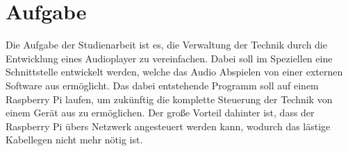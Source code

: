 \section{Aufgabe}
Die Aufgabe der Studienarbeit ist es, die Verwaltung der Technik durch die
Entwicklung eines Audioplayer zu vereinfachen. Dabei soll im Speziellen eine
Schnittstelle entwickelt werden, welche das Audio Abspielen von einer
externen Software aus ermöglicht. Das dabei entstehende Programm soll auf einem
Raspberry Pi laufen, um zukünftig die komplette Steuerung der Technik von
einem Gerät aus zu ermöglichen. Der große Vorteil dahinter ist, dass der
Raspberry Pi übers Netzwerk angesteuert werden kann, wodurch das lästige
Kabellegen nicht mehr nötig ist.

